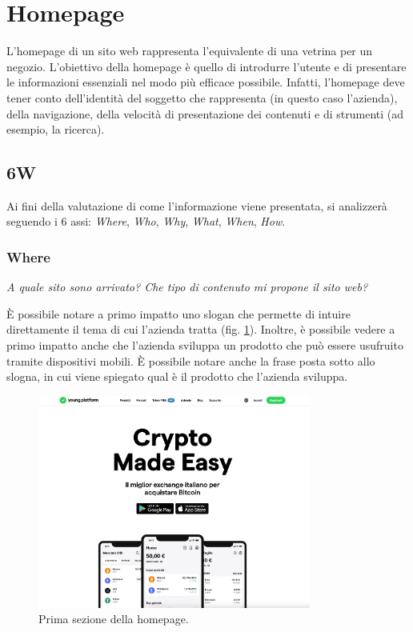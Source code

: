 \section{Homepage}

L'homepage di un sito web rappresenta l'equivalente di una vetrina per un 
negozio. L'obiettivo della homepage è quello di introdurre l'utente e di 
presentare le informazioni essenziali nel modo più efficace possibile. 
Infatti, l'homepage deve tener conto dell'identità del soggetto che 
rappresenta (in questo caso l'azienda), della navigazione, della velocità 
di presentazione dei contenuti e di strumenti (ad esempio, la ricerca). 

\subsection{6W}

Ai fini della valutazione di come l'informazione viene presentata, si 
analizzerà seguendo i 6 assi: \textit{Where}, \textit{Who}, \textit{Why}, 
\textit{What}, \textit{When}, \textit{How}. 

\subsubsection{Where}

\centerline{\textit{A quale sito sono arrivato? Che tipo di contenuto mi 
propone il sito web?}}
È possibile notare a primo impatto uno slogan che permette di intuire 
direttamente il tema di cui l'azienda tratta (fig. \ref{fig:homepage-1}). 
Inoltre, è possibile vedere a primo impatto anche che l'azienda sviluppa 
un prodotto che può essere usufruito tramite dispositivi mobili. È 
possibile notare anche la frase posta sotto allo slogna, in cui viene 
spiegato qual è il prodotto che l'azienda sviluppa. 

\begin{figure}[H]
	\centering
	\includegraphics[width=0.80\textwidth]{res/images/homepage-1.png}
	\caption{Prima sezione della homepage.}
	\label{fig:homepage-1}
\end{figure}

